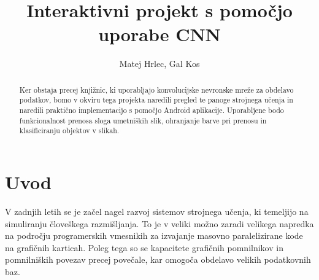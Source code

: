 \documentclass[runningheads,a4paper]{llncs}
\newcommand{\keywords}[1]{\par\addvspace\baselineskip
\noindent\keywordname\enspace\ignorespaces#1}
\begin{document}
\mainmatter  %

\title{Interaktivni projekt s pomočjo uporabe CNN}


%
%
\author{Matej Hrlec, Gal Kos}
%


%
%

\maketitle


\begin{abstract}
Ker obstaja precej knjižnic, ki uporabljajo konvolucijske nevronske mreže za obdelavo podatkov, bomo v okviru tega projekta naredili pregled te panoge strojnega učenja in naredili praktično implementacijo s pomočjo Android aplikacije. Uporabljene bodo funkcionalnost prenosa sloga umetniških slik, ohranjanje barve pri prenosu in klasificiranju objektov v slikah.
\end{abstract}


\section{Uvod}
V zadnjih letih se je začel nagel razvoj sistemov strojnega učenja, ki temeljijo na simuliranju človeškega razmišljanja. To je v veliki možno zaradi velikega napredka na področju programerskih vmesnikih za izvajanje masovno paralelizirane kode na grafičnih karticah. Poleg tega so se kapacitete grafičnih pomnilnikov in pomnilniških povezav precej povečale, kar omogoča obdelavo velikih podatkovnih baz.
\end{document}
